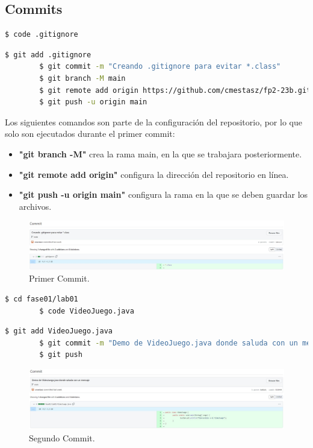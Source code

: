 \documentclass{article}
\begin{document}
\subsection{Commits}
\begin{lstlisting}[language=bash,caption={Creando .gitignore}]
		$ code .gitignore
	\end{lstlisting}
\begin{lstlisting}[language=bash,caption={Primer Commit / .gitignore}]
		$ git add .gitignore
		$ git commit -m "Creando .gitignore para evitar *.class"
		$ git branch -M main
		$ git remote add origin https://github.com/cmestasz/fp2-23b.git
		$ git push -u origin main
	\end{lstlisting}
Los siguientes comandos son parte de la configuración del repositorio, por lo que solo son ejecutados durante el primer commit:
\begin{itemize}
	\item \textbf{"git branch -M"} crea la rama main, en la que se trabajara posteriormente.
	\item \textbf{"git remote add origin"} configura la dirección del repositorio en línea.
	\item \textbf{"git push -u origin main"} configura la rama en la que se deben guardar los archivos.
\end{itemize}
\begin{figure}[H]
	\centering
	\includegraphics[width=1\textwidth,keepaspectratio]{img/commit01.jpg}
	\caption{Primer Commit.}
\end{figure}
\begin{lstlisting}[language=bash,caption={Creando VideoJuego.java}]
		$ cd fase01/lab01
		$ code VideoJuego.java
	\end{lstlisting}
\begin{lstlisting}[language=bash,caption={Segundo Commit / VideoJuego.java}]
		$ git add VideoJuego.java
		$ git commit -m "Demo de VideoJuego.java donde saluda con un mensaje"
		$ git push
	\end{lstlisting}
\begin{figure}[H]
	\centering
	\includegraphics[width=1\textwidth,keepaspectratio]{img/commit02.jpg}
	\caption{Segundo Commit.}
\end{figure}
\end{document}
